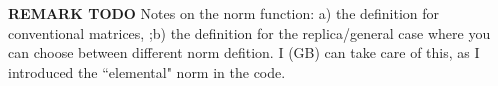 \documentclass[edipack2.tex]{subfiles}
\begin{document}


{\bf REMARK TODO}
Notes on the norm function: a) the definition for conventional
matrices, ;b) the definition for the replica/general case where you
can choose between different norm defition.
{\color{red} I (GB) can take care of this, as I introduced the ``elemental" norm in the code.}
\end{document}
